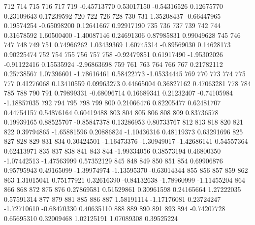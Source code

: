 \documentclass{article}
\begin{document}
\begin{Schunk}
\begin{Soutput}
        712         714         715         716         717         719 
-0.45713770  0.53017150 -0.54316526  0.12675770  0.23109643  0.17239592 
        720         722         726         728         730         731 
 1.35208437 -0.66447965  0.19574254 -0.65098200  0.12641667  0.92917190 
        735         736         737         739         742         744 
 0.31678592  1.60500400 -1.40087146  0.24691306  0.87985831  0.99049628 
        745         746         747         748         749         751 
 0.74966262  1.03439369  1.60745314 -0.89569030  0.14628173  0.90225474 
        752         754         755         756         757         758 
-0.92479851  0.61917490 -1.95302026 -0.91122416  0.15535924 -2.96863698 
        759         761         763         764         766         767 
 0.21782112  0.25738567  1.07396601 -1.78616461  0.58422773 -1.05334445 
        769         770         773         774         775         777 
 0.41276068  0.13410559  0.09963273  0.44665004  0.36827162  0.47063281 
        778         784         785         788         790         791 
 0.79899331 -0.68096714  0.16689341  0.21232407 -0.74105984 -1.18857035 
        792         794         795         798         799         800 
 0.21066476  0.82205477  0.62481707  0.44754157  0.54876164  0.60419488 
        803         804         805         806         808         809 
 0.83736578  0.19939165  0.88525707 -0.85847378  0.13286953  0.80733767 
        812         813         818         820         821         822 
 0.39794865 -1.65881596  0.20886824 -1.10436316  0.48119373  0.63291696 
        825         827         828         829         831         834 
 0.30424501 -1.16473376 -1.30949017 -1.42686141  0.54557364  0.62413971 
        835         837         838         841         843         844 
-1.99334056  0.38573194  0.46800350 -1.07442513 -1.47563999  0.57352129 
        845         848         849         850         851         854 
 0.69906876  0.95795943  0.49165099 -1.39974974 -1.13595370 -0.63014344 
        855         856         857         859         862         863 
 1.31015041  0.75177921  0.32616390 -0.84132638 -1.78960999 -1.11455204 
        864         866         868         872         875         876 
 0.27869581  0.51529861  0.30961598  0.24165664  1.27222035  0.57591314 
        877         879         881         885         886         887 
 1.58191114 -1.17176081  0.23724247 -1.72710610 -0.68470330  0.40635110 
        888         889         890         891         893         894 
-0.74207728  0.65695310  0.32009468  1.02125191  1.07089308  0.39525224 

\end{Soutput}
\end{Schunk}
\end{document}
